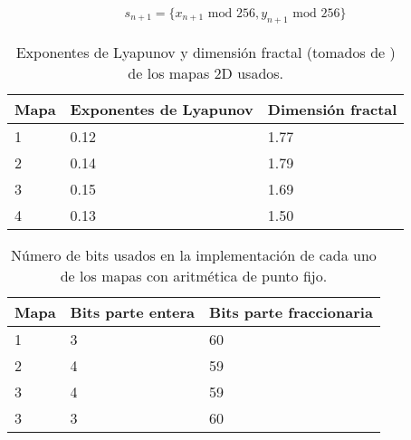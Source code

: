         \begin{equation}
            \begin{array}{lcl}
                s_{n+1} = \{ x_{n+1} \text{ mod } 256, y_{n+1} \text{ mod } 256 \}
            \end{array}
        \end{equation}

        \begin{table}[htbp]
            \centering
            \caption{Exponentes de Lyapunov y dimensión fractal (tomados de \cite{Sprott1993}) de los mapas 2D usados.}
            \begin{tabular}{|l|l|l|}
                \hline
                \rowcolor{lightgray} Mapa  & Exponentes de Lyapunov & Dimensión fractal \\
                \hline
                1     & 0.12                   & 1.77   \\
                \hline
                2     & 0.14                   & 1.79   \\
                \hline
                3     & 0.15                   & 1.69   \\
                \hline
                4     & 0.13                   & 1.50   \\
                \hline
            \end{tabular}
        \end{table}

        \begin{table}[htbp]
            \centering
            \caption{Número de bits usados en la implementación de cada uno de los mapas con aritmética de punto fijo.}
            \begin{tabular}{|l|l|l|}
                \hline
                \rowcolor{lightgray} Mapa  & Bits parte entera & Bits parte fraccionaria \\
                \hline
                1     & 3                   & 60   \\
                \hline
                2     & 4                   & 59   \\
                \hline
                3     & 4                   & 59   \\
                \hline
                3     & 3                   & 60   \\
                \hline
            \end{tabular}
        \end{table}

